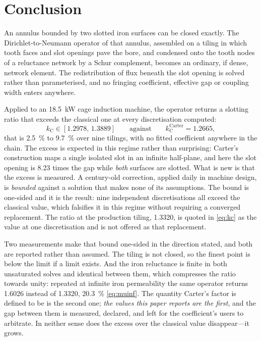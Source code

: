 \documentclass[10pt,a4paper,twocolumn]{article}
\theoremstyle{plain}
\theoremstyle{remark}
\begin{document}

\section{Conclusion}
\label{sec:conclusion}

An annulus bounded by two slotted iron surfaces can be closed exactly.
The Dirichlet-to-Neumann operator of that annulus, assembled on a tiling
in which tooth faces and slot openings pave the bore, and condensed onto
the tooth nodes of a reluctance network by a Schur complement, becomes
an ordinary, if dense, network element. The redistribution of flux
beneath the slot opening is solved rather than parameterised, and no
fringing coefficient, effective gap or coupling width enters anywhere.

Applied to an \SI{18.5}{\kilo\watt} cage induction machine, the operator
returns a slotting ratio that exceeds the classical one at every
discretisation computed:
\begin{equation*}
k_{\mathrm{C}}\in[\num{1.2978},\,\num{1.3889}]
\qquad\text{against}\qquad
k_{\mathrm{C}}^{\text{Carter}}=\num{1.2665},
\end{equation*}
that is \SI{+2.5}{\percent} to \SI{+9.7}{\percent} over nine tilings,
with no fitted coefficient anywhere in the chain. The excess is expected
in this regime rather than surprising:
Carter's construction maps a single isolated slot in an infinite
half-plane, and here the slot opening is \num{8.23} times the gap while
\emph{both} surfaces are slotted. What is new is that the excess is
measured. A century-old correction, applied daily in machine design, is
\emph{bounded} against a solution that makes none of its assumptions.
The bound is one-sided and it is the result: nine independent
discretisations all exceed the classical value, which falsifies it in
this regime without requiring a converged replacement. The ratio at the
production tiling, \num{1.3320}, is quoted in \eqref{eq:kc} as the value
at one discretisation and is not offered as that replacement.

Two measurements make that bound one-sided in the direction stated, and
both are reported rather than assumed. The tiling is not closed, so the
finest point is below the limit if a limit exists. And the iron
reluctance is finite in both unsaturated solves and identical between
them, which compresses the ratio towards unity: repeated at infinite
iron permeability the same operator returns \num{1.6026} instead of
\num{1.3320}, \SI{+20.3}{\percent} \eqref{eq:muinf}. The quantity
Carter's factor is defined to be is the second one; \emph{the values
this paper reports are the first}, and the gap between them is measured,
declared, and left for the coefficient's users to arbitrate. In neither
sense does the excess over the classical value disappear---it grows.
\end{document}
